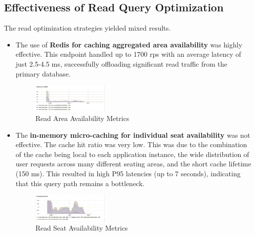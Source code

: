 \subsection{Effectiveness of Read Query Optimization}
The read optimization strategies yielded mixed results.
\begin{itemize}
    \item The use of \textbf{Redis for caching aggregated area availability} was highly effective. This endpoint handled up to 1700 rps with an average latency of just 2.5-4.5 ms, successfully offloading significant read traffic from the primary database.
          \begin{figure}[H]
              \centering
              \includegraphics[width=0.35\textwidth]{resources/chapter-4/latency-area-availability.png}
              \caption{Read Area Availability Metrics}
              \label{fig:latency-get-area}
          \end{figure}

    \item The \textbf{in-memory micro-caching for individual seat availability} was not effective. The cache hit ratio was very low. This was due to the combination of the cache being local to each application instance, the wide distribution of user requests across many different seating areas, and the short cache lifetime (150 ms). This resulted in high P95 latencies (up to 7 seconds), indicating that this query path remains a bottleneck.
          \begin{figure}[H]
              \centering
              \includegraphics[width=0.35\textwidth]{resources/chapter-4/latency-seat-availability.png}
              \caption{Read Seat Availability Metrics}
              \label{fig:latency-get-seat}
          \end{figure}
\end{itemize}


